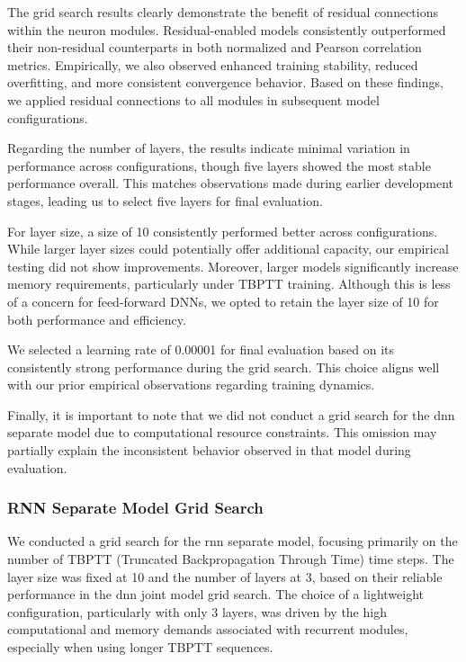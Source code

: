 The grid search results clearly demonstrate the benefit of residual connections within the neuron modules. Residual-enabled models consistently outperformed their non-residual counterparts in both normalized and Pearson correlation metrics. Empirically, we also observed enhanced training stability, reduced overfitting, and more consistent convergence behavior. Based on these findings, we applied residual connections to all modules in subsequent model configurations.

Regarding the number of layers, the results indicate minimal variation in performance across configurations, though five layers showed the most stable performance overall. This matches observations made during earlier development stages, leading us to select five layers for final evaluation.


For layer size, a size of 10 consistently performed better across configurations. While larger layer sizes could potentially offer additional capacity, our empirical testing did not show improvements. Moreover, larger models significantly increase memory requirements, particularly under TBPTT training. Although this is less of a concern for feed-forward DNNs, we opted to retain the layer size of 10 for both performance and efficiency.

We selected a learning rate of 0.00001 for final evaluation based on its consistently strong performance during the grid search. This choice aligns well with our prior empirical observations regarding training dynamics.

Finally, it is important to note that we did not conduct a grid search for the dnn separate model due to computational resource constraints. This omission may partially explain the inconsistent behavior observed in that model during evaluation.

\subsubsection{RNN Separate Model Grid Search}
\label{subsubsec:rnn_grid_search}
We conducted a grid search for the rnn separate model, focusing primarily on the number of TBPTT (Truncated Backpropagation Through Time) time steps. The layer size was fixed at 10 and the number of layers at 3, based on their reliable performance in the dnn joint model grid search. The choice of a lightweight configuration, particularly with only 3 layers, was driven by the high computational and memory demands associated with recurrent modules, especially when using longer TBPTT sequences.

